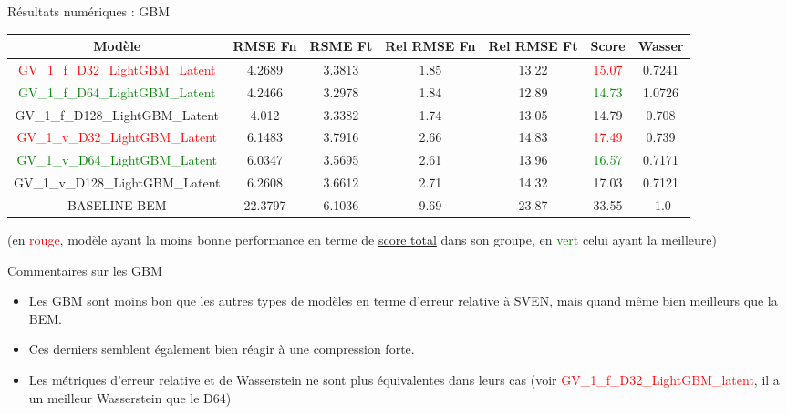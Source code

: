 \documentclass[
11pt,notheorems,hyperref={pdfauthor=whatever}
]{beamer}
\begin{document}
\begin{frame}{Résultats numériques : GBM}
    \begin{tabular}{| c | c c c c c c |}
        \hline
        Modèle & RMSE Fn & RSME Ft & Rel RMSE Fn & Rel RMSE Ft & Score & Wasser \\
        \hline        
        \textcolor{red}{GV\_1\_f\_D32\_LightGBM\_Latent}	&4.2689	&3.3813	&1.85	&13.22	&\textcolor{red}{15.07}	&0.7241 \\
        \textcolor{green}{GV\_1\_f\_D64\_LightGBM\_Latent}	&4.2466	&3.2978	&1.84	&12.89	&\textcolor{green}{14.73}	&1.0726 \\
        GV\_1\_f\_D128\_LightGBM\_Latent	&4.012	&3.3382	&1.74	&13.05	&14.79	&0.708 \\
        \hline
        \textcolor{red}{GV\_1\_v\_D32\_LightGBM\_Latent}	&6.1483	&3.7916	&2.66	&14.83	&\textcolor{red}{17.49}	&0.739 \\
        \textcolor{green}{GV\_1\_v\_D64\_LightGBM\_Latent}	&6.0347	&3.5695	&2.61	&13.96	&\textcolor{green}{16.57}	&0.7171 \\
        GV\_1\_v\_D128\_LightGBM\_Latent	&6.2608	&3.6612	&2.71	&14.32	&17.03	&0.7121 \\
        \hline
        BASELINE BEM	&22.3797&6.1036	&9.69	&23.87	&33.55	&-1.0 \\
        \hline
    \end{tabular}

    \vspace{0.3cm}

    (en \textcolor{red}{rouge}, modèle ayant la moins bonne performance en terme de \underline{score total} dans son groupe, en \textcolor{green}{vert} celui ayant la meilleure)

\end{frame}

\begin{frame}{Commentaires sur les GBM}
    \begin{itemize}
        \item Les GBM sont moins bon que les autres types de modèles en terme d'erreur relative à SVEN, mais quand même bien meilleurs que la BEM.
        \item Ces derniers semblent également bien réagir à une compression forte.
        \item Les métriques d'erreur relative et de Wasserstein ne sont plus équivalentes dans leurs cas (voir \textcolor{red}{GV\_1\_f\_D32\_LightGBM\_latent}, il a un meilleur Wasserstein que le D64)  
    
    \end{itemize}
    
\end{frame}
\end{document}
